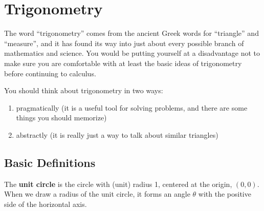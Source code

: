 \section{Trigonometry}

The word ``trigonometry'' comes from the ancient Greek words for ``triangle'' and ``measure'', and it has found its way into just about every possible branch of mathematics and science. You would be putting yourself at a disadvantage not to make sure you are comfortable with at least the basic ideas of trigonometry before continuing to calculus.

You should think about trigonometry in two ways:
\begin{enumerate}
\item pragmatically (it is a useful tool for solving problems, and there are some things you should memorize)
\item abstractly (it is really just a way to talk about similar triangles)
\end{enumerate}

\subsection{Basic Definitions}
The \textbf{unit circle} is the circle with (unit) radius 1, centered at the origin, $(0,0)$. When we draw a radius of the unit circle, it forms an angle $\theta$ with the positive side of the horizontal axis.

